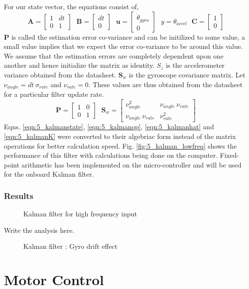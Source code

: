 For our state vector, the equations consist of,
\begin{equation}
\bm{A} = \left[ \begin{array}{cc} 1& dt\\0&1\end{array}\right]\:\:\:\bm{B} = \left[ \begin{array}{c} dt\\0\end{array}\right]\:\:\:
\bm{u} = \left[ \begin{array}{c} \dot{\theta}_{gyro}\\0\end{array}\right]\:\:\:y = \theta_{accel}\:\:\: \bm{C} = \left[ \begin{array}{c} 1\\0\end{array}\right]
\end{equation}
$\bm{P}$ is called the estimation error co-variance and can be initilized to some value, a small value implies that we expect the
error co-variance to be around this value. We assume that the estimation errors are completely dependent upon one another and hence
initialize the matrix as identity. $S_z$ is the accelerometer variance obtained from the datasheet. $\bm{S}_w$ is the gyroscope
covariance matrix. Let $\nu_{angle} = dt\:\sigma_{rate}$ and $\nu_{rate} = 0$. These values are thus obtained from the datasheet
for a particular filter update rate.
\begin{equation}
\bm{P} = \left[ \begin{array}{cc} 1& 0\\0&1\end{array}\right]\:\:\:\bm{S}_w = \left[ \begin{array}{cc} \nu_{angle}^2 &\nu_{angle}\:\nu_{rate}\\ \nu_{angle}\:\nu_{rate}&\nu_{rate}^2\end{array}\right]
\end{equation}
Eqns. \ref{eqn:5_kalmanstate}, \ref{eqn:5_kalmanop}, \ref{eqn:5_kalmanhat} and \ref{eqn:5_kalmanK} were converted to their algebriac 
form instead of the matrix operations for better calculation speed. Fig. \ref{fig:5_kalman_lowfreq} shows the performance of this
filter with calculations being done on the computer. Fixed-point arithmetic has been implemented on the micro-controller and will
be used for the onboard Kalman filter.

\subsubsection{Results}
\begin{figure}[!h]
\centering
\caption{Kalman filter for high frequency input}
\label{fig:5_kalman_highfreq}
\end{figure}
Write the analysis here.
\begin{figure}[!h]
\centering
\caption{Kalman filter : Gyro drift effect}
\label{fig:5_kalman_gyrodrift}
\end{figure}

\section{Motor Control}






